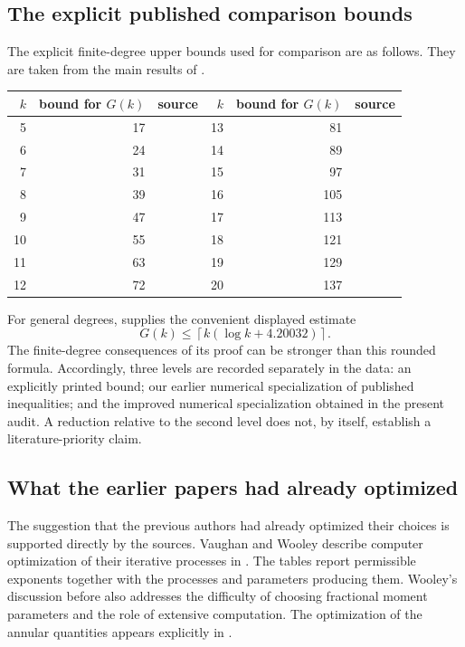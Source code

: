 \documentclass[11pt,letterpaper]{article}
\numberwithin{equation}{section}
\begin{document}
\subsection{The explicit published comparison bounds}

The explicit finite-degree upper bounds used for comparison are as follows.
They are taken from the main results of \cite{VW94,VW95,W16,BW23}.

\begin{center}
\begin{tabular}{rrl@{\qquad}rrl}
\hline
$k$ & bound for $G(k)$ & source & $k$ & bound for $G(k)$ & source\\
\hline
5 & 17 & \cite{VW95} & 13 & 81 & \cite{W16}\\
6 & 24 & \cite{VW94} & 14 & 89 & \cite{BW23}\\
7 & 31 & \cite{W16} & 15 & 97 & \cite{BW23}\\
8 & 39 & \cite{W16} & 16 & 105 & \cite{BW23}\\
9 & 47 & \cite{W16} & 17 & 113 & \cite{BW23}\\
10 & 55 & \cite{W16} & 18 & 121 & \cite{BW23}\\
11 & 63 & \cite{W16} & 19 & 129 & \cite{BW23}\\
12 & 72 & \cite{W16} & 20 & 137 & \cite{BW23}\\
\hline
\end{tabular}
\end{center}

For general degrees, \cite[Theorem~1.1]{BW23} supplies the convenient
displayed estimate
\[
 G(k)\le \left\lceil k(\log k+4.20032)\right\rceil.
\]
The finite-degree consequences of its proof can be stronger than this
rounded formula. Accordingly, three levels are recorded separately in the
data: an explicitly printed bound; our earlier numerical specialization of
published inequalities; and the improved numerical specialization obtained
in the present audit. A reduction relative to the second level does not,
by itself, establish a literature-priority claim.

\subsection{What the earlier papers had already optimized}

The suggestion that the previous authors had already optimized their
choices is supported directly by the sources. Vaughan and Wooley describe
computer optimization of their iterative processes in \cite[\S8]{VW00}.
The tables report permissible exponents together with the processes and
parameters producing them. Wooley's discussion before
\cite[Lemma~1]{W00QD} also addresses the difficulty of choosing fractional
moment parameters and the role of extensive computation. The optimization
of the annular quantities appears explicitly in \cite[\S\S7--8]{BW23}.
\end{document}

